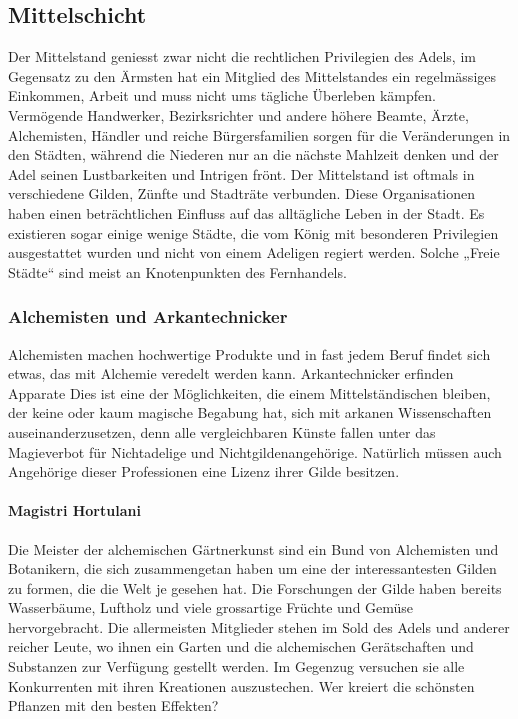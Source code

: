 \documentclass[10pt,twoside,twocolumn,openany]{book}
\begin{document}
\subsection{Mittelschicht}
Der Mittelstand geniesst zwar nicht die rechtlichen Privilegien des Adels, im Gegensatz zu den Ärmsten hat ein Mitglied des Mittelstandes ein regelmässiges Einkommen, Arbeit und muss nicht ums tägliche Überleben kämpfen. Vermögende Handwerker, Bezirksrichter und andere höhere Beamte, Ärzte, Alchemisten, Händler und reiche Bürgersfamilien sorgen für die Veränderungen in den Städten, während die Niederen nur an die nächste Mahlzeit denken und der Adel seinen Lustbarkeiten und Intrigen frönt. Der Mittelstand ist oftmals in verschiedene Gilden, Zünfte und Stadträte verbunden. Diese Organisationen haben einen beträchtlichen Einfluss auf das alltägliche Leben in der Stadt. Es existieren sogar einige wenige Städte, die vom König mit besonderen Privilegien ausgestattet wurden und nicht von einem Adeligen regiert werden. Solche „Freie Städte“ sind meist an Knotenpunkten des Fernhandels.


\subsubsection{Alchemisten und Arkantechnicker}
Alchemisten machen hochwertige Produkte und in fast jedem Beruf findet sich etwas, das mit Alchemie veredelt werden kann. Arkantechnicker erfinden Apparate  Dies ist eine der Möglichkeiten, die einem Mittelständischen bleiben, der keine oder kaum magische Begabung hat, sich mit arkanen Wissenschaften auseinanderzusetzen, denn alle vergleichbaren Künste fallen unter das Magieverbot für Nichtadelige und Nichtgildenangehörige. Natürlich müssen auch Angehörige dieser Professionen  eine Lizenz ihrer Gilde besitzen.

\paragraph{Magistri Hortulani} Die Meister der alchemischen Gärtnerkunst sind ein Bund von Alchemisten und Botanikern, die sich zusammengetan haben um eine der interessantesten Gilden zu formen, die die Welt je gesehen hat. Die Forschungen der Gilde haben bereits Wasserbäume, Luftholz und viele grossartige Früchte und Gemüse hervorgebracht. Die allermeisten Mitglieder stehen im Sold des Adels und anderer reicher Leute, wo ihnen ein Garten und die alchemischen Gerätschaften und Substanzen zur Verfügung gestellt werden. Im Gegenzug versuchen sie alle Konkurrenten mit ihren Kreationen auszustechen. Wer kreiert die schönsten Pflanzen mit den besten Effekten?
\end{document}
